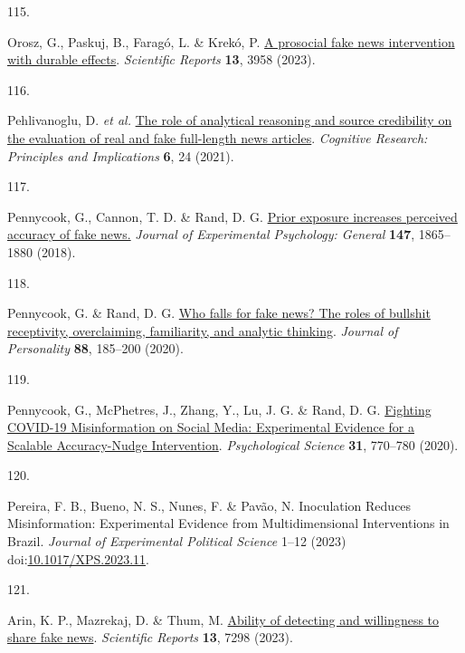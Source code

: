 \documentclass[
  man]{apa6}
\newlength{\cslhangindent}
\newlength{\csllabelwidth}
\newenvironment{CSLReferences}[2] %
 {\begin{list}{}{%
  \setlength{\itemindent}{0pt}
  \setlength{\leftmargin}{0pt}
  \setlength{\parsep}{0pt}
  \ifodd #1
   \setlength{\leftmargin}{\cslhangindent}
   \setlength{\itemindent}{-1\cslhangindent}
  \fi
  \setlength{\itemsep}{#2\baselineskip}}}
 {\end{list}}
\newcommand{\CSLLeftMargin}[1]{\parbox[t]{\csllabelwidth}{\strut#1\strut}}
\newcommand{\CSLRightInline}[1]{\parbox[t]{\linewidth - \csllabelwidth}{\strut#1\strut}}
\begin{document}
\begin{CSLReferences}{0}{0}
\CSLLeftMargin{115. }%
\CSLRightInline{*Orosz, G., Paskuj, B., Faragó, L. \& Krekó, P. \href{https://doi.org/10.1038/s41598-023-30867-7}{A prosocial fake news intervention with durable effects}. \emph{Scientific Reports} \textbf{13}, 3958 (2023).}

\CSLLeftMargin{116. }%
\CSLRightInline{*Pehlivanoglu, D. \emph{et al.} \href{https://doi.org/10.1186/s41235-021-00292-3}{The role of analytical reasoning and source credibility on the evaluation of real and fake full-length news articles}. \emph{Cognitive Research: Principles and Implications} \textbf{6}, 24 (2021).}

\CSLLeftMargin{117. }%
\CSLRightInline{*Pennycook, G., Cannon, T. D. \& Rand, D. G. \href{https://doi.org/10.1037/xge0000465}{Prior exposure increases perceived accuracy of fake news.} \emph{Journal of Experimental Psychology: General} \textbf{147}, 1865--1880 (2018).}

\CSLLeftMargin{118. }%
\CSLRightInline{*Pennycook, G. \& Rand, D. G. \href{https://doi.org/10.1111/jopy.12476}{Who falls for fake news? The roles of bullshit receptivity, overclaiming, familiarity, and analytic thinking}. \emph{Journal of Personality} \textbf{88}, 185--200 (2020).}

\CSLLeftMargin{119. }%
\CSLRightInline{*Pennycook, G., McPhetres, J., Zhang, Y., Lu, J. G. \& Rand, D. G. \href{https://doi.org/10.1177/0956797620939054}{Fighting COVID-19 Misinformation on Social Media: Experimental Evidence for a Scalable Accuracy-Nudge Intervention}. \emph{Psychological Science} \textbf{31}, 770--780 (2020).}

\CSLLeftMargin{120. }%
\CSLRightInline{*Pereira, F. B., Bueno, N. S., Nunes, F. \& Pavão, N. Inoculation Reduces Misinformation: Experimental Evidence from Multidimensional Interventions in Brazil. \emph{Journal of Experimental Political Science} 1--12 (2023) doi:\href{https://doi.org/10.1017/XPS.2023.11}{10.1017/XPS.2023.11}.}

\CSLLeftMargin{121. }%
\CSLRightInline{*Arin, K. P., Mazrekaj, D. \& Thum, M. \href{https://doi.org/10.1038/s41598-023-34402-6}{Ability of detecting and willingness to share fake news}. \emph{Scientific Reports} \textbf{13}, 7298 (2023).}


\end{CSLReferences}
\end{document}
